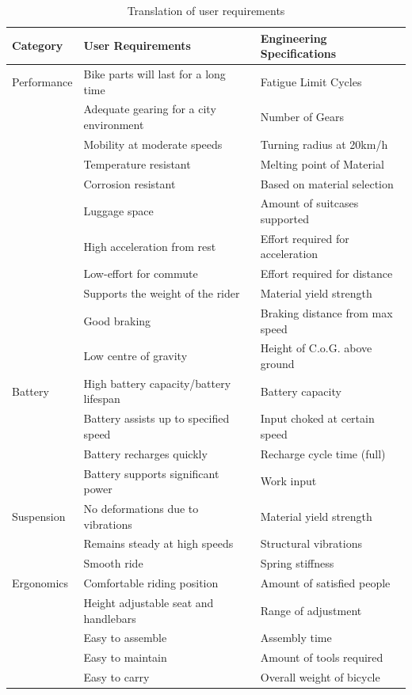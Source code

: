 \documentclass[a4paper,11pt]{article}
\begin{document}
\begin{table}[!ht]
	\centering
	\caption{Translation of user requirements}
	\begin{tabular}{l l l}
		\hline
		Category&User Requirements&Engineering Specifications\\\hline
	Performance&Bike parts will last for a long time&Fatigue Limit Cycles\\
		&Adequate gearing for a city environment&Number of Gears\\
		&Mobility at moderate speeds&Turning radius at 20km/h\\
		&Temperature resistant&Melting point of Material\\
		&Corrosion resistant&Based on material selection\\
		&Luggage space&Amount of suitcases supported\\
		&High acceleration from rest&Effort required for acceleration\\
		&Low-effort for commute&Effort required for distance\\
		&Supports the weight of the rider&Material yield strength\\
		&Good braking&Braking distance from max speed\\
		&Low centre of gravity&Height of C.o.G. above ground\\\hline
	Battery&High battery capacity/battery lifespan&Battery capacity\\
		&Battery assists up to specified speed&Input choked at certain speed\\
		&Battery recharges quickly&Recharge cycle time (full)\\
		&Battery supports significant power&Work input\\\hline
	Suspension&No deformations due to vibrations&Material yield strength\\
		&Remains steady at high speeds&Structural vibrations\\
		&Smooth ride&Spring stiffness\\\hline
	Ergonomics&Comfortable riding position&Amount of satisfied people\\
		&Height adjustable seat and handlebars&Range of adjustment\\
		&Easy to assemble&Assembly time\\
		&Easy to maintain&Amount of tools required\\
		&Easy to carry&Overall weight of bicycle\\
	\end{tabular}
\end{table}
\end{document}
